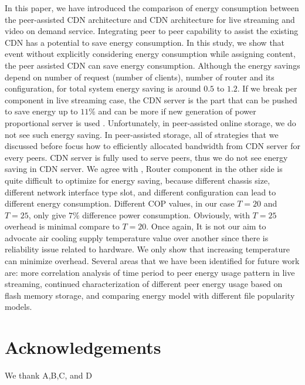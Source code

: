 \documentclass[conference]{IEEEtran}
\begin{document}
In this paper, we have introduced the comparison of energy consumption between the peer-assisted CDN architecture and CDN architecture for live streaming and video on demand service.
Integrating peer to peer capability to assist the existing CDN has a potential to save energy consumption.
In this study, we show that event without explicitly considering energy consumption while assigning content, the peer assisted CDN can save energy consumption.
Although the energy savings depend on number of request (number of clients), number of router and its configuration, for total system energy saving is around $0.5$ to $1.2$.
If we break per component in live streaming case, the CDN server is the part that can be pushed to save energy up to $11\%$ and can be more if new generation of power proportional server is used \cite{Krioukov:2011:NDI:1925861.1925878}.
Unfortunately, in peer-assisted online storage, we do not see such energy saving.  
In peer-assisted storage, all of strategies that we discussed before focus how to efficiently allocated bandwidth from CDN server for every peers.
CDN server is fully used to serve peers, thus we do not see energy saving in CDN server.
We agree with \cite{4509688}, Router component in the other side is quite difficult to optimize for energy saving, because different chassis size, different network interface type slot, and different configuration can lead to different energy consumption.
Different COP values, in our case $T=20$ and $T=25$, only give $7\%$ difference power consumption.
Obviously, with $T=25$ overhead is minimal compare to $T=20$.
Once again, It is not our aim to advocate air cooling supply temperature value over another since there is reliability issue related to hardware.  
We only show that increasing temperature can minimize overhead.
Several areas that we have been identified for future work are: more correlation analysis of time period to peer energy usage pattern in live streaming, continued characterization of different peer energy usage based on flash memory storage, and comparing energy model with different file popularity models.


\section*{Acknowledgements}
We thank A,B,C, and D

\end{document}
